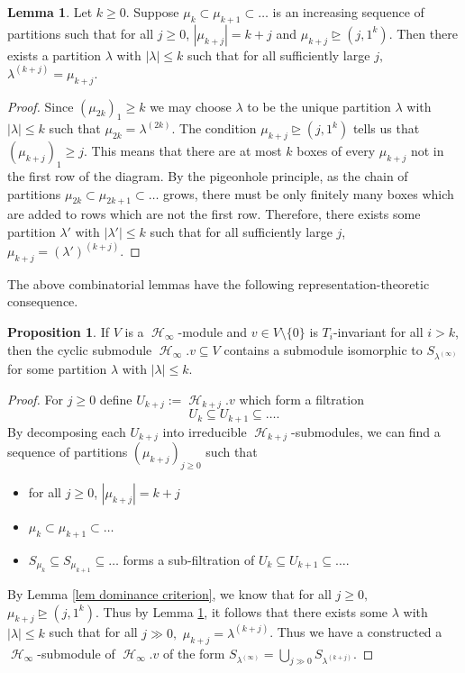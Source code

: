\documentclass[12pt,reqno]{amsart}
\theoremstyle{definition}
\newtheorem{lem}[thm]{Lemma}
\newtheorem{prop}[thm]{Proposition}
\DeclareMathOperator{\cH}{\mathcal{H}}
\begin{document}
\begin{lem}\label{lem rep stability for inf hecke}
    Let $k \geq 0.$ Suppose $\mu_{k} \subset \mu_{k+1} \subset \dots$ is an increasing sequence of partitions such that for all $j \geq 0$, $|\mu_{k+j}| = k+j$ and $\mu_{k+j} \trianglerighteq (j,1^k).$ Then there exists a partition $\lambda$ with $|\lambda| \leq k$ such that for all sufficiently large $j,$ $\lambda^{(k+j)} = \mu_{k+j}.$
\end{lem}
\begin{proof}
    Since $(\mu_{2k})_1 \geq k$ we may choose $\lambda$ to be the unique partition $\lambda$ with $|\lambda| \leq k$ such that $\mu_{2k} = \lambda^{(2k)}.$ The condition $\mu_{k+j} \trianglerighteq (j,1^k)$ tells us that $(\mu_{k+j})_1 \geq j.$ This means that there are at most $k$ boxes of every $\mu_{k+j}$ not in the first row of the diagram. By the pigeonhole principle, as the chain of partitions $\mu_{2k} \subset \mu_{2k+1}\subset \dots$ grows, there must be only finitely many boxes which are added to rows which are not the first row. Therefore, there exists some partition $\lambda'$ with $|\lambda'| \leq k$ such that for all sufficiently large $j$, $\mu_{k+j} = (\lambda')^{(k+j)}.$
\end{proof}

The above combinatorial lemmas have the following representation-theoretic consequence.

\begin{prop}\label{prop cyclic vect give specht mods}
    If $V$ is a $\cH_{\infty}$-module and $v \in V \setminus \{0\}$ is $T_i$-invariant for all $i> k$, then the cyclic submodule $\cH_{\infty}.v \subseteq V$ contains a submodule isomorphic to $S_{\lambda^{(\infty)}}$ for some partition $\lambda$ with $|\lambda| \leq k.$
\end{prop}
\begin{proof}
    For $j \geq 0$ define $U_{k+j}:= \cH_{k+j}.v$ which form a filtration 
    $$U_{k} \subseteq U_{k+1} \subseteq \dots.$$ By decomposing each $U_{k+j}$ into irreducible $\cH_{k+j}$-submodules, we can find a sequence of partitions $(\mu_{k+j})_{j \geq 0}$ such that 
    \begin{itemize}
        \item for all $j \geq 0$, $|\mu_{k+j}| = k+j$
        \item $\mu_{k} \subset \mu_{k+1}\subset \dots$
        \item $S_{\mu_k} \subseteq S_{\mu_{k+1}}\subseteq \dots$ forms a sub-filtration of $U_{k} \subseteq U_{k+1} \subseteq \dots.$
    \end{itemize}

    By Lemma \ref{lem dominance criterion}, we know that for all $j \geq 0,$ $\mu_{k+j} \trianglerighteq (j,1^k).$ Thus by Lemma \ref{lem rep stability for inf hecke}, it follows that there exists some $\lambda$ with $|\lambda| \leq k$ such that for all $j \gg 0,$ $\mu_{k+j} = \lambda^{(k+j)}$. Thus we have a constructed a $\cH_{\infty}$-submodule of $\cH_{\infty}.v$ of the form 
    $ S_{\lambda^{(\infty)}} = \bigcup_{j \gg 0} S_{\lambda^{(k+j)}}.$
\end{proof}
\end{document}
